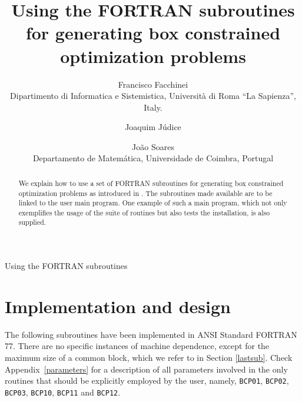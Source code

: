 %
%


\def\bkR{{\rm I\kern-.17em R}}
\def\bkN{{\rm I\kern-.17em N}}



\title{Using the FORTRAN subroutines for generating box constrained 
optimization problems}

\author{Francisco Facchinei\\
Dipartimento di
Informatica  e Sistemistica,
Universit\`a di Roma ``La Sapienza'',
Italy. \and
Joaquim J\'udice \and
Jo\~ao Soares\\ Departamento de Matem\'atica, Universidade de Coimbra, 
Portugal}

\begin{abstract}
We explain how to use a set of FORTRAN subroutines for generating box 
constrained optimization problems as introduced in 
\cite{soares95,soares95a}. The subroutines made available are to be linked 
to the user main program. One example of such a main program, which not only 
exemplifies the usage of the suite of routines but also
tests the installation, is also supplied. 
\end{abstract}

\begin{bottomstuff}
\begin{authinfo}
\address{
Departamento de Matem\'atica, Universidade de Coimbra, 3000 Coimbra, Portugal.
Email: {\tt jsoares@mat.uc.pt}
}
\end{authinfo}
\end{bottomstuff}

        {Using the FORTRAN subroutines}

\maketitle


\section{\label{software}Implementation and design}

The following subroutines have been  implemented in ANSI Standard FORTRAN 77. 
There are no specific instances of machine 
dependence, except for the maximum size of a common block, which we refer 
to in Section \ref{lastsub}. Check Appendix~\ref{parameters} for a 
description of all parameters
involved in the only routines that should be explicitly employed by the user, 
namely, {\tt BCP01},  {\tt BCP02}, {\tt BCP03}, {\tt BCP10}, {\tt BCP11} and  
{\tt BCP12}. 

